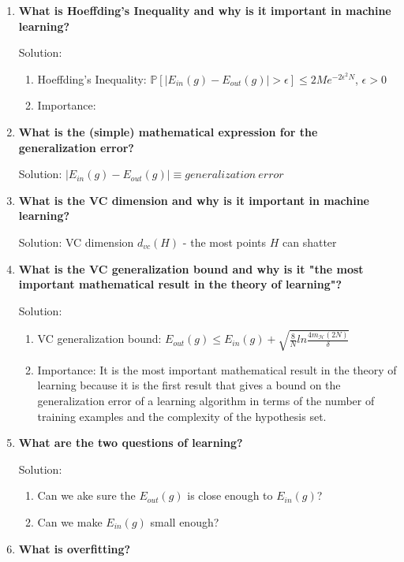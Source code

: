 \documentclass[10pt]{article} %
\begin{document}
\begin{enumerate}
\item \textbf{What is Hoeffding's Inequality and why is it important in machine learning?}

Solution:
\begin{enumerate}
    \item Hoeffding's Inequality: $\mathbb{P}[|E_{in}(g) - E_{out}(g)| > \epsilon] \leq 2Me^{-2\epsilon^2N}$, $\epsilon > 0$
    \item Importance:
\end{enumerate}
\bigskip


\item \textbf{What is the (simple) mathematical expression for the generalization error?}

Solution: $|E_{in}(g)-E_{out}(g)| \equiv generalization\ error$
\bigskip


\item \textbf{What is the VC dimension and why is it important in machine learning?}

Solution: VC dimension $d_{vc}(H)$ - the most points $H$ can shatter
\bigskip


\item \textbf{What is the VC generalization bound and why is it "the most important mathematical result in the theory of learning"?}

Solution: 
\begin{enumerate}
    \item VC generalization bound: $E_{out}(g) \leq E_{in}(g) + \sqrt{\frac{8}{N}ln\frac{4m_{\mathcal{H}}(2N)}{\delta}}$
    \item Importance: It is the most important mathematical result in the theory of learning because it is the first result that gives a bound on the generalization error of a learning algorithm in terms of the number of training examples and the complexity of the hypothesis set.
\end{enumerate}
\bigskip


\item \textbf{What are the two questions of learning?}

Solution:
\begin{enumerate}
    \item Can we ake sure the $E_{out}(g)$ is close enough to $E_{in}(g)$?
    \item Can we make $E_{in}(g)$ small enough?
\end{enumerate}
\bigskip


\item \textbf{What is overfitting?}


\end{enumerate}
\end{document}

